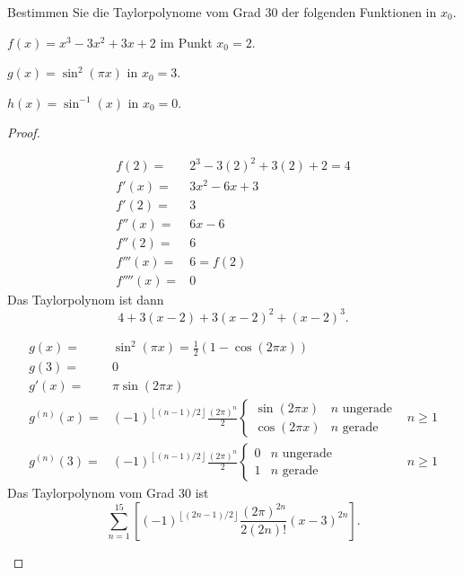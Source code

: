 \begin{Problem}
	Bestimmen Sie die Taylorpolynome vom Grad 30 der folgenden Funktionen in $x_0$.
	\begin{parts}
	\item $f(x)=x^3-3x^2+3x+2$ im Punkt $x_0=2$.
	\item $g(x)=\sin^2\left( \pi x \right) $ in $x_0=3$.
	\item $h(x)=\sin^{-1}(x)$ in $x_0=0$.
	\end{parts}
\end{Problem}
\begin{proof}
	\begin{parts}
	\item 
		{\allowdisplaybreaks
		\begin{align*}
			f(2)=&2^3-3(2)^2+3(2)+2=4\\
			f'(x)=&3x^2-6x+3\\
			f'(2)=&3\\
			f''(x)=&6x-6\\
			f''(2)=&6\\
			f'''(x)=&6=f(2)\\
			f''''(x)=&0
		\end{align*}
	}
		Das Taylorpolynom ist dann
		\[
		4+3(x-2)+3(x-2)^2+(x-2)^3
		.\] 
	\item {\allowdisplaybreaks
		\begin{align*}
			g(x)=&\sin^2(\pi x)=\frac{1}{2}\left( 1-\cos(2\pi x) \right) \\
			g(3)=&0\\
			g'(x)=&\pi \sin(2\pi x)\\
			g^{(n)}(x)=&\left( -1 \right)^{\left\lfloor (n-1) / 2 \right\rfloor}\frac{(2\pi)^{n}}{2}\begin{cases}
				\sin(2\pi x) & n\text{ ungerade}\\
				\cos(2\pi x) & n\text{ gerade}
			\end{cases} & n\geq 1\\
				g^{(n)}(3)=& \left( -1 \right) ^{\left\lfloor (n - 1) / 2 \right\rfloor}\frac{(2\pi)^n}{2}\begin{cases}
					0 & n\text{ ungerade}\\
					1 & n\text{ gerade}	
				\end{cases} & n \ge 1
		\end{align*}
	}
		Das Taylorpolynom vom Grad 30 ist
		\[
			\sum_{n=1}^{15}\left[ \left( -1 \right) ^{\left\lfloor (2n -1) / 2 \right\rfloor}\frac{(2\pi)^{2n}}{2(2n)!}(x-3)^{2n}\right]
		.\] 
	\item

\end{parts}
\end{proof}

